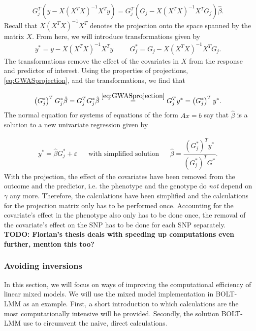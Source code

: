\begin{equation} \label{eq:GWASprojection}
	G_j^T(y - X(X^TX)^{-1}X^Ty) = G_j^T(G_j - X(X^TX)^{-1}X^TG_j) \hat{\beta}.
\end{equation}
Recall that $ X(X^TX)^{-1}X^T $ denotes the projection onto the space spanned by the matrix $ X $. From here, we will introduce transformations given by 
\begin{align}
	y^\ast = y - X(X^TX)^{-1}X^Ty & & & G_j^{\ast} = G_j - X(X^TX)^{-1}X^TG_j.
\end{align}
The transformations remove the effect of the covariates in $ X $ from the response and predictor of interest. Using the properties of projections, \cref{eq:GWASprojection}, and the transformations, we find that 

\begin{equation}
	\left( G_j^{\ast} \right)^T G_j^{\ast} \hat{\beta} = G_j^T G_j^{\ast} \hat{\beta} \stackrel{\ref{eq:GWASprojection}}{=} G_j^T y^{\ast} = \left( G_j^{\ast} \right)^T y^{\ast}.
\end{equation}
The normal equation for systems of equations of the form $ Ax=b $ say that $ \hat{\beta} $ is a solution to a new univariate regression given by

\begin{align}\label{eq:univarGWAS}
	y^\ast = \hat{\beta} G_j^{\ast} + \varepsilon&   &\text{with simplified solution}&  &\hat{\beta} = \dfrac{\left( G_j^{\ast} \right)^T y^{\ast}}{\left( G_j^{\ast} \right)^T G^{\ast}}.
\end{align}
With the projection, the effect of the covariates have been removed from the outcome and the predictor, i.e. the phenotype and the genotype do \textit{not} depend on $ \gamma $ any more. Therefore, the calculations have been simplified and the calculations for the projection matrix only has to be performed once. Accounting for the covariate's effect in the phenotype also only has to be done once, the removal of the covariate's effect on the SNP has to be done for each SNP separately.
\textbf{TODO: Florian's thesis deals with speeding up computations even further, mention this too?}


\subsubsection{Avoiding inversions}

In this section, we will focus on ways of improving the computational efficiency of linear mixed models. We will use the mixed model implementation in BOLT-LMM as an example. First, a short introduction to which calculations are the most computationally intensive will be provided. Secondly, the solution BOLT-LMM use to circumvent the naive, direct calculations. 

